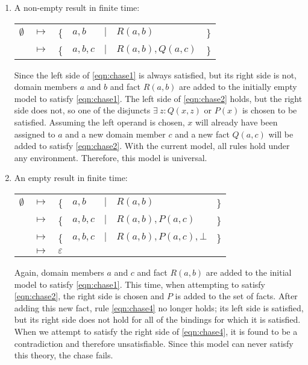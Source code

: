 		\begin{enumerate}
		\item A non-empty result in finite time:

			\begin{tabular}{lllllll}
				$\emptyset$ & $\mapsto$ & \{ & $a,b$   & $|$ & $R(a,b)$         & \} \\
				{}          & $\mapsto$ & \{ & $a,b,c$ & $|$ & $R(a,b), Q(a,c)$ & \}
			\end{tabular}

			Since the left side of \eqref{eqn:chase1} is always satisfied, but
			its right side is not, domain members $a$ and $b$ and fact $R(a,b)$
			are added to the initially empty model to satisfy \eqref{eqn:chase1}.
			The left side of \eqref{eqn:chase2} holds, but the right side does
			not, so one of the disjuncts $\exists\ z : Q(x,z)$ or $P(x)$ is
			chosen to be satisfied. Assuming the left operand is chosen, $x$
			will already have been assigned to $a$ and a new domain member $c$
			and a new fact $Q(a,c)$ will be added to satisfy \eqref{eqn:chase2}.
			With the current model, all rules hold under any environment.
			Therefore, this model is universal.

		\item An empty result in finite time:

			\begin{tabular}{lllllll}
				$\emptyset$ & $\mapsto$ & \{ & $a,b$   & $|$ & $R(a,b)$               & \} \\
				{}          & $\mapsto$ & \{ & $a,b,c$ & $|$ & $R(a,b), P(a,c)$       & \} \\
				{}          & $\mapsto$ & \{ & $a,b,c$ & $|$ & $R(a,b), P(a,c), \bot$ & \} \\
				{}          & $\mapsto$ & \multicolumn{5}{l}{ $\varepsilon$ }
			\end{tabular}

			Again, domain members $a$ and $c$ and fact $R(a,b)$ are added to
			the initial model to satisfy \eqref{eqn:chase1}. This time, when
			attempting to satisfy \eqref{eqn:chase2}, the right side is chosen
			and $P$ is added to the set of facts. After adding this new fact,
			rule \eqref{eqn:chase4} no longer holds; its left side is
			satisfied, but its right side does not hold for all of the bindings
			for which it is satisfied. When we attempt to satisfy the right
			side of \eqref{eqn:chase4}, it is found to be a contradiction and
			therefore unsatisfiable. Since this model can never satisfy this
			theory, the chase fails.


\end{enumerate}

